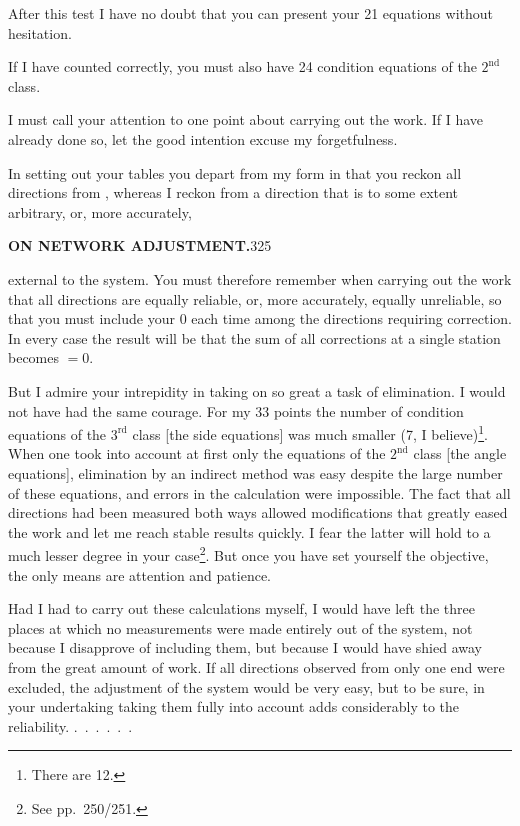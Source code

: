 After this test I have no doubt that you can present your 21 equations
without hesitation.

If I have counted correctly, you must also have 24 condition equations of
the $2^{\mathrm{nd}}$ class.

I must call your attention to one point about carrying out the work. If I
have already done so, let the good intention excuse my forgetfulness.

In setting out your tables you depart from my form in that you reckon all
directions from , whereas I reckon from a direction that
is to some extent arbitrary, or, more accurately,\par
\clearpage
\noindent\textbf{ON NETWORK ADJUSTMENT.}\hfill325\par\medskip
\noindent external to the system. You must therefore remember when carrying out the
work that all directions are equally reliable, or, more accurately, equally
unreliable, so that you must include your 0 each time among the directions
requiring correction. In every case the result will be that the sum of all
corrections at a single station becomes $=0$.

\begingroup
\def\letterfivestars{*}
\makeatletter
\renewcommand{\@makefnmark}{\hbox{\normalfont[\textsuperscript{\letterfivestars})]}}
\renewcommand{\@makefntext}[1]{\parindent1em\noindent\hbox to2.4em{\hss[\textsuperscript{\letterfivestars})\ }#1]}
\makeatother
But I admire your intrepidity in taking on so great a task of elimination.
I would not have had the same courage. For my 33 points the number of
condition equations of the $3^{\mathrm{rd}}$ class [the side equations] was
much smaller (7, I believe)\footnote{There are 12.}. When one took into account
at first only the equations of the $2^{\mathrm{nd}}$ class [the angle equations],
elimination by an indirect method was easy despite the large number of these
equations, and errors in the calculation were impossible. The fact that all directions
had been measured both ways allowed modifications that greatly eased the
work and let me reach stable results quickly. I fear the latter will hold
to a much lesser degree in your case\def\letterfivestars{**}\footnote{See pp.\ 250/251.}.
But once you have set yourself the objective, the only means are attention
and patience.

Had I had to carry out these calculations myself, I would have left the
three places at which no measurements were made entirely out of the system,
not because I disapprove of including them, but because I would have
shied away from the great amount of work. If all directions observed from
only one end were excluded, the adjustment of the system would be
very easy, but to be sure, in your undertaking taking them fully into
account adds considerably to the reliability. .\ .\ .\ .\ .\ .

